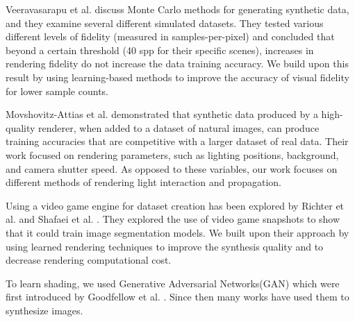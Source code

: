 \documentclass[10pt,twocolumn,letterpaper]{article}
\begin{document}
Veeravasarapu et al. \cite{DBLP:journals/corr/VeeravasarapuRR16} discuss Monte Carlo methods for generating synthetic data, and they examine several different simulated datasets. They tested various different levels of fidelity (measured in samples-per-pixel) and concluded that beyond a certain threshold (40 spp for their specific scenes), increases in rendering fidelity do not increase the data training accuracy. We build upon this result by using learning-based methods to improve the accuracy of visual fidelity for lower sample counts.

Movshovitz-Attias et al. \cite{DBLP:journals/corr/Movshovitz-Attias16} demonstrated that synthetic data produced by a high-quality renderer, when added to a dataset of natural images, can produce training accuracies that are competitive with a larger dataset of real data. Their work focused on rendering parameters, such as lighting positions, background, and camera shutter speed. As opposed to these variables, our work focuses on different methods of rendering light interaction and propagation.

Using a video game engine for dataset creation has been explored by Richter et al. \cite{DBLP:journals/corr/RichterVRK16} and  Shafaei et al. \cite{DBLP:journals/corr/ShafaeiLS16}. They explored the use of video game snapshots to show that it could train image segmentation models. We built upon their approach by using learned rendering techniques to improve the synthesis quality and to decrease rendering computational cost.


To learn shading, we used Generative Adversarial Networks(GAN) which were first introduced by Goodfellow et al. \cite{goodfellow}. Since then many works have used them to synthesize images. 

\end{document}

